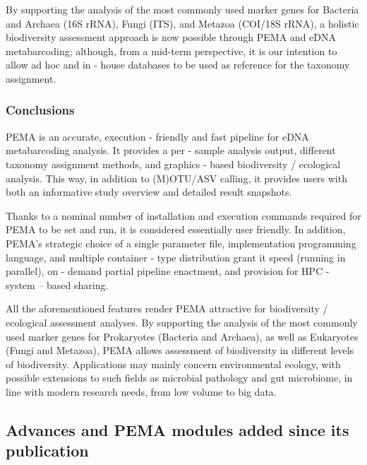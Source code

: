       By supporting the analysis of the most commonly used marker genes for Bacteria and Archaea (16S rRNA), Fungi (ITS), and Metazoa (COI/18S rRNA), a holistic biodiversity assessment approach is now possible through PEMA and eDNA metabarcoding; although, from a mid-term perspective, it is our intention to allow ad hoc and in - house databases to be used as reference for the taxonomy assignment.

   \subsubsection{Conclusions}
   \label{subsec:pema-conclusion}

      PEMA is an accurate, execution - friendly and fast pipeline for eDNA metabarcoding analysis. 
      It provides a per - sample analysis output, different taxonomy assignment methods, and graphics - based biodiversity / ecological analysis. 
      This way, in addition to (M)OTU/ASV calling, it provides users with both an informative study overview and detailed result snapshots.

      Thanks to a nominal number of installation and execution commands required for PEMA to be set and run, it is considered essentially user friendly. 
      In addition, PEMA's strategic choice of a single parameter file, implementation programming language, and multiple container - type distribution grant it speed (running in parallel), on - demand partial pipeline enactment, and provision for HPC - system – based sharing.

      All the aforementioned features render PEMA attractive for biodiversity / ecological assessment analyses. 
      By supporting the analysis of the most commonly used marker genes for Prokaryotes (Bacteria and Archaea), as well as Eukaryotes (Fungi and Metazoa), PEMA allows assessment of biodiversity in different levels of biodiversity. 
      Applications may mainly concern environmental ecology, with possible extensions to such fields as microbial pathology and gut microbiome, in line with modern research needs, from low volume to big data.


   \subsection{Advances and PEMA modules added since its publication}

